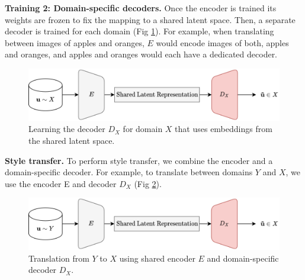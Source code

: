 \documentclass{article}
\begin{document}
\textbf{Training 2: Domain-specific decoders.} Once the encoder is trained its weights are frozen to fix the mapping to a shared latent space. Then, a separate decoder is trained for each domain (Fig \ref{fig:train}). For example, when translating between images of apples and oranges, $E$ would encode images of both, apples and oranges, and apples and oranges would each have a dedicated decoder.
\begin{figure}[H]
  \centering
  \includegraphics[width=0.6\linewidth]{report/assets/train.png}
  \caption{Learning the decoder $D_X$ for domain $X$ that uses embeddings from the shared latent space.}
  \label{fig:train}
\end{figure}
    
    

\textbf{Style transfer.} To perform style transfer, we combine the encoder and a domain-specific decoder. For example, to translate between domains $Y$ and $X$, we use the encoder E and decoder $D_X$ (Fig \ref{fig:eval}).

\begin{figure}[H]
  \centering
  \includegraphics[width=0.6\linewidth]{report/assets/eval.png}
  \caption{Translation from $Y$ to $X$ using shared encoder $E$ and domain-specific decoder $D_X$.}
  \label{fig:eval}
\end{figure}
\end{document}
